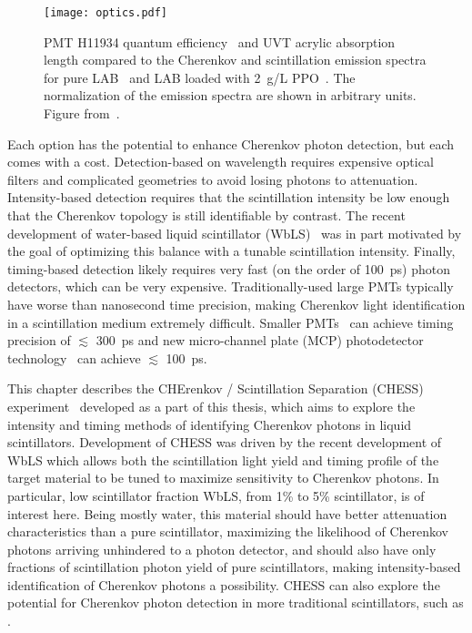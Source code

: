 \begin{figure}
\centering
\texttt{[image: optics.pdf]}
\caption{\label{fig:optics} PMT H11934 quantum efficiency~\cite{h11934} and UVT acrylic absorption length compared to the Cherenkov and scintillation emission spectra for pure LAB~\cite{lab_emission} and LAB loaded with 2~g/L PPO~\cite{snop_private}. The normalization of the emission spectra are shown in arbitrary units. Figure from~\cite{chess_nim}.}
\end{figure}

Each option has the potential to enhance Cherenkov photon detection, but each comes with a cost.
Detection-based on wavelength requires expensive optical filters and complicated geometries to avoid losing photons to attenuation.
Intensity-based detection requires that the scintillation intensity be low enough that the Cherenkov topology is still identifiable by contrast.
The recent development of water-based liquid scintillator (WbLS)~\cite{wbls} was in part motivated by the goal of optimizing this balance with a tunable scintillation intensity.
Finally, timing-based detection likely requires very fast (on the order of 100~ps) photon detectors, which can be very expensive.
Traditionally-used large PMTs typically have worse than nanosecond time precision, making Cherenkov light identification in a scintillation medium extremely difficult.
Smaller PMTs~\cite{h11934} can achieve timing precision of $\lesssim$ 300~ps and new micro-channel plate (MCP) photodetector technology~\cite{mcp, lappd, lappd2} can achieve  $\lesssim$ 100~ps.


This chapter describes the CHErenkov / Scintillation Separation (CHESS) experiment~\cite{chess_nim} developed as a part of this thesis, which aims to explore the intensity and timing methods of identifying Cherenkov photons in liquid scintillators. 
Development of CHESS was driven by the recent development of WbLS which allows both the scintillation light yield and timing profile of the target material to be tuned to maximize sensitivity to Cherenkov photons.  
In particular, low scintillator fraction WbLS, from 1\% to 5\% scintillator, is of interest here. 
Being mostly water, this material should have better attenuation characteristics than a pure scintillator, maximizing the likelihood of Cherenkov photons arriving unhindered to a photon detector, and should also have only fractions of scintillation photon yield of pure scintillators, making intensity-based identification of Cherenkov photons a possibility.
CHESS can also explore the potential for Cherenkov photon detection in more traditional scintillators, such as {\labppo}.

